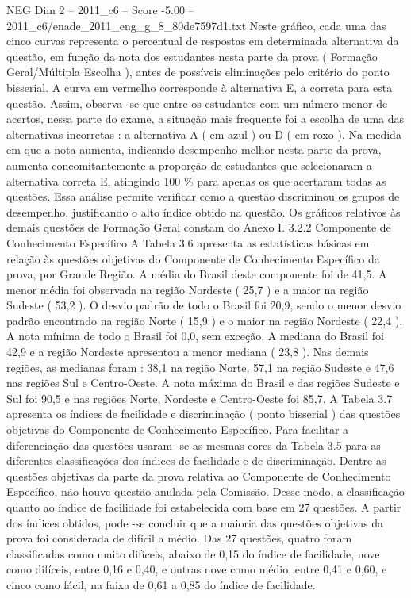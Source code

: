 \begin{textsample}{NEG Dim 2 – 2011\_c6 – Score -5.00 – 2011\_c6/enade\_2011\_eng\_g\_8\_80de7597d1.txt}
Neste gráfico, cada uma das cinco curvas representa o percentual de respostas em determinada alternativa da questão, em função da nota dos estudantes nesta parte da prova ( Formação Geral/Múltipla Escolha ), antes de possíveis eliminações pelo critério do ponto bisserial.
A curva em vermelho corresponde à alternativa E, a correta para esta questão.
Assim, observa -se que entre os estudantes com um número menor de acertos, nessa parte do exame, a situação mais frequente foi a escolha de uma das alternativas incorretas : a alternativa A ( em azul ) ou D ( em roxo ).
Na medida em que a nota aumenta, indicando desempenho melhor nesta parte da prova, aumenta concomitantemente a proporção de estudantes que selecionaram a alternativa correta E, atingindo 100 \% para apenas os que acertaram todas as questões.
Essa análise permite verificar como a questão discriminou os grupos de desempenho, justificando o alto índice obtido na questão.
Os gráficos relativos às demais questões de Formação Geral constam do Anexo I. 3.2.2 Componente de Conhecimento Específico A Tabela 3.6 apresenta as estatísticas básicas em relação às questões objetivas do Componente de Conhecimento Específico da prova, por Grande Região.
A média do Brasil deste componente foi de 41,5.
A menor média foi observada na região Nordeste ( 25,7 ) e a maior na região Sudeste ( 53,2 ).
O desvio padrão de todo o Brasil foi 20,9, sendo o menor desvio padrão encontrado na região Norte ( 15,9 ) e o maior na região Nordeste ( 22,4 ).
A nota mínima de todo o Brasil foi 0,0, sem exceção.
A mediana do Brasil foi 42,9 e a região Nordeste apresentou a menor mediana ( 23,8 ).
Nas demais regiões, as medianas foram : 38,1 na região Norte, 57,1 na região Sudeste e 47,6 nas regiões Sul e Centro-Oeste.
A nota máxima do Brasil e das regiões Sudeste e Sul foi 90,5 e nas regiões Norte, Nordeste e Centro-Oeste foi 85,7.
A Tabela 3.7 apresenta os índices de facilidade e discriminação ( ponto bisserial ) das questões objetivas do Componente de Conhecimento Específico.
Para facilitar a diferenciação das questões usaram -se as mesmas cores da Tabela 3.5 para as diferentes classificações dos índices de facilidade e de discriminação.
Dentre as questões objetivas da parte da prova relativa ao Componente de Conhecimento Específico, não houve questão anulada pela Comissão.
Desse modo, a classificação quanto ao índice de facilidade foi estabelecida com base em 27 questões.
A partir dos índices obtidos, pode -se concluir que a maioria das questões objetivas da prova foi considerada de difícil a médio.
Das 27 questões, quatro foram classificadas como muito difíceis, abaixo de 0,15 do índice de facilidade, nove como difíceis, entre 0,16 e 0,40, e outras nove como médio, entre 0,41 e 0,60, e cinco como fácil, na faixa de 0,61 a 0,85 do índice de facilidade.

\end{textsample}
